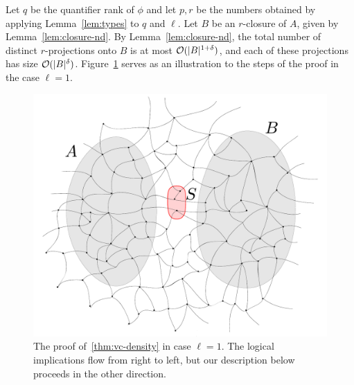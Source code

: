 	Let $q$ be the quantifier rank of $\phi$ and let 
$p,r$ be the numbers obtained by applying Lemma~\ref{lem:types} to $q$ and $\ell$.
Let $B$ be an $r$-closure of $A$, given by Lemma~\ref{lem:closure-nd}.
  By Lemma~\ref{lem:closure-nd}, the total number of distinct $r$-projections onto $B$ 
  is at most $\mathcal{O}(|B|^{1+\delta})$, and each of these projections has size $\mathcal{O}(|B|^{\delta})$.
%
  	   Figure~\ref{fig:sketch} serves as  an illustration to the steps of the proof in the case $\ell=1$.
  	   \begin{figure}[h!]
  	   	\centering
  	   		\includegraphics[width=\textwidth,page=4]{pics}
%
%
  			\caption{The proof of~\autoref{thm:vc-density} in case $\ell=1$. 
  The logical implications flow from right to left,
  but our description below proceeds in the other direction.
  			}
  	   	\label{fig:sketch}
  	   \end{figure}	
	
